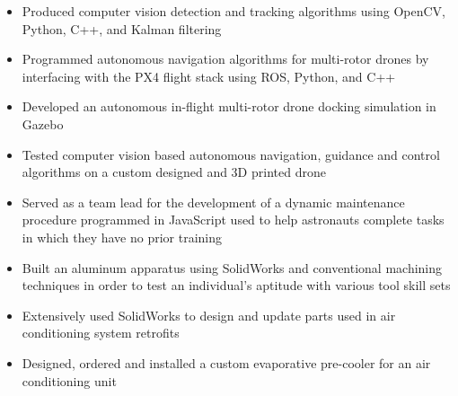 \documentclass[10pt,ragged2e]{altacv}
\begin{document}

\begin{fullwidth}
  \makecvheader
\end{fullwidth}



\begin{itemize}
  \item Produced computer vision detection and tracking algorithms using OpenCV, Python, C++, and Kalman filtering
  \item Programmed autonomous navigation algorithms for multi-rotor drones by interfacing with the PX4 flight stack using ROS, Python, and C++ 
  \item Developed an autonomous in-flight multi-rotor drone docking simulation in Gazebo
  \item Tested computer vision based autonomous navigation, guidance and control algorithms on a custom designed and 3D printed drone
\end{itemize}

\begin{itemize}
  \item Served as a team lead for the development of a dynamic maintenance procedure programmed in JavaScript used to help astronauts complete tasks in which they have no prior training 
  \item Built an aluminum apparatus using SolidWorks and conventional machining techniques in order to test an individual’s aptitude with various tool skill sets
\end{itemize}

\divider

\begin{itemize}
  \item Extensively used SolidWorks to design and update parts used in air conditioning system retrofits
  \item Designed, ordered and installed a custom evaporative pre-cooler for an air conditioning unit
\end{itemize}
\end{document}
